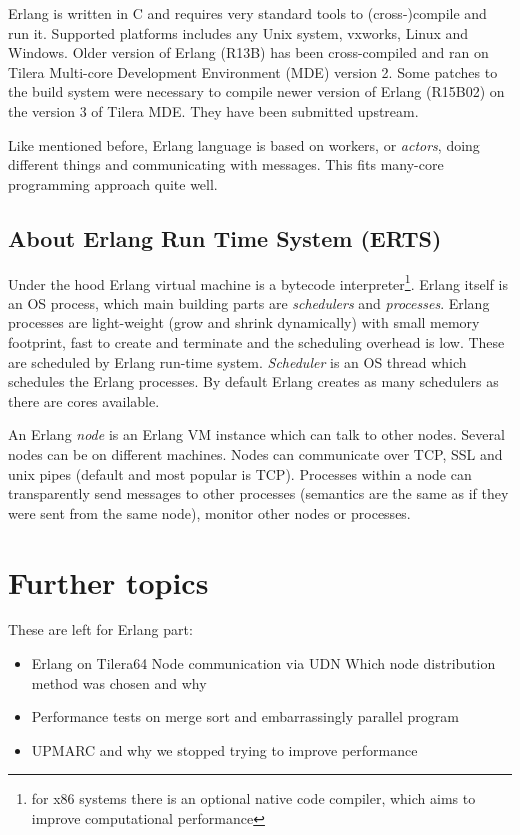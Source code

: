 \documentclass[english,11pt]{article}
\begin{document}
Erlang is written in C and requires very standard tools to (cross-)compile and
run it. Supported platforms includes any Unix system, vxworks, Linux and
Windows. Older version of Erlang (R13B) has been cross-compiled and ran on
Tilera Multi-core Development Environment (MDE) version 2. Some patches to the
build system were necessary to compile newer version of Erlang (R15B02) on the
version 3 of Tilera MDE. They have been submitted upstream.

Like mentioned before, Erlang language is based on workers, or {\em actors},
doing different things and communicating with messages. This fits many-core
programming approach quite well.

\subsection{About Erlang Run Time System (ERTS)}

Under the hood Erlang virtual machine is a bytecode interpreter\footnote{for
x86 systems there is an optional native code compiler, which aims to improve
computational performance\cite{hipe}}. Erlang itself is an OS process, which
main building parts are {\em schedulers} and {\em processes}. Erlang processes
are light-weight (grow and shrink dynamically) with small memory footprint,
fast to create and terminate and the scheduling overhead is low. These are
scheduled by Erlang run-time system. {\em Scheduler} is an OS thread which
schedules the Erlang processes. By default Erlang creates as many schedulers as
there are cores available.

An Erlang {\em node} is an Erlang VM instance which can talk to other nodes.
Several nodes can be on different machines. Nodes can communicate over TCP, SSL
and unix pipes (default and most popular is TCP). Processes within a node can
transparently send messages to other processes (semantics are the same as if
they were sent from the same node), monitor other nodes or processes.

\section{Further topics}

These are left for Erlang part:
\begin{itemize}
    \item Erlang on Tilera64
        \subitem Node communication via UDN
        \subitem Which node distribution method was chosen and why
    \item Performance tests on merge sort and embarrassingly parallel program
    \item UPMARC and why we stopped trying to improve performance
\end{itemize}
\end{document}
